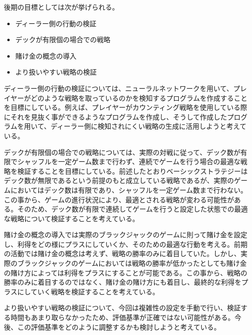 後期の目標としては次が挙げられる。

\begin{itemize}
\item ディーラー側の行動の検証
\item デックが有限個の場合での戦略
\item 賭け金の概念の導入
\item より扱いやすい戦略の検証
\end{itemize}

ディーラー側の行動の検証については、ニューラルネットワークを用いて、プレイヤーがどのような戦略を取っているのかを検知するプログラムを作成することを目標にしている。例えば、プレイヤーがカウンティング戦略を使用している際にそれを見抜く事ができるようなプログラムを作成し、そうして作成したプログラムを用いて、ディーラー側に検知されにくい戦略の生成に活用しようと考えている。

デックが有限個の場合での戦略については、実際の対戦に従って、デック数が有限でシャッフルを一定ゲーム数まで行わず、連続でゲームを行う場合の最適な戦略を検証することを目標にしている。前述したとおりベーシックストラテジーはデック数が無限であるという前提のもと成立している戦略であるが、実際のゲームにおいてはデック数は有限であり、シャッフルを一定ゲーム数まで行わない。この事から、ゲームの進行状況により、最適とされる戦略が変わる可能性がある。そのため、デック数が有限で連続してゲームを行うと設定した状態での最適な戦略について検証することを考えている。

賭け金の概念の導入では実際のブラックジャックのゲームに則って賭け金を設定し、利得をどの様にプラスにしていくか、そのための最適な行動を考える。前期の活動では賭け金の概念は考えず、戦略の勝率のみに着目していた。しかし、実際のブラックジャックのゲームにおいては戦略の勝率が低かったとしても賭け金の賭け方によっては利得をプラスにすることが可能である。この事から、戦略の勝率のみに着目するのではなく、賭け金の賭け方にも着目し、最終的な利得をプラスにしていく戦略を検証することを考えている。

より扱いやすい戦略の検証について、今回は複雑性の設定を手動で行い、検証する時間もあまり取らなかったため、評価基準が正確ではない可能性がある。今後、この評価基準をどのように調整するかも検討しようと考えている。

